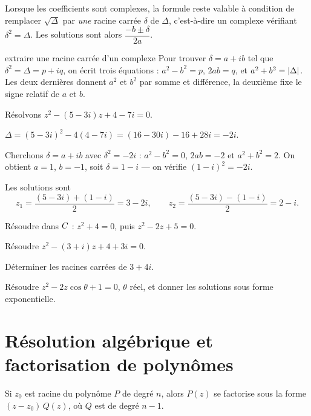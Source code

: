 \begin{propriete}
Lorsque les coefficients sont complexes, la formule reste valable à condition
de remplacer $\sqrt\Delta$ par \emph{une} racine carrée $\delta$ de $\Delta$,
c'est-à-dire un complexe vérifiant $\delta^{2} = \Delta$. Les solutions sont
alors $\dfrac{-b\pm\delta}{2a}$.
\end{propriete}

\begin{methode}{extraire une racine carrée d'un complexe}
Pour trouver $\delta = a+ib$ tel que $\delta^{2} = \Delta = p+iq$, on écrit
trois équations : $a^{2}-b^{2} = p$, $2ab = q$, et
$a^{2}+b^{2} = \left|\Delta\right|$. Les deux dernières donnent $a^{2}$ et $b^{2}$ par
somme et différence, la deuxième fixe le signe relatif de $a$ et $b$.
\end{methode}

\begin{exemple}
Résolvons $z^{2}-(5-3i)z+4-7i = 0$.

$\Delta = (5-3i)^{2}-4(4-7i) = (16-30i)-16+28i = -2i$.

Cherchons $\delta = a+ib$ avec $\delta^{2} = -2i$ : $a^{2}-b^{2} = 0$,
$2ab = -2$ et $a^{2}+b^{2} = 2$. On obtient $a = 1$, $b = -1$, soit
$\delta = 1-i$ — on vérifie $(1-i)^{2} = -2i$.

Les solutions sont
\[
  z_{1} = \frac{(5-3i)+(1-i)}{2} = 3-2i,
  \qquad
  z_{2} = \frac{(5-3i)-(1-i)}{2} = 2-i .
\]
\end{exemple}

\begin{entrainement}[équations]
\exo[\niveau{1}] Résoudre dans $C$ : $z^{2}+4 = 0$, puis $z^{2}-2z+5 = 0$.

\exo[\niveau{2}] Résoudre $z^{2}-(3+i)z+4+3i = 0$.

\exo[\niveau{2}] Déterminer les racines carrées de $3+4i$.

\exo[\niveau{3}] Résoudre $z^{2}-2z\cos\theta+1 = 0$, $\theta$ réel, et donner
les solutions sous forme exponentielle.
\end{entrainement}

\section{Résolution algébrique et factorisation de polynômes}

\begin{propriete}
Si $z_{0}$ est racine du polynôme $P$ de degré $n$, alors $P(z)$ se factorise
sous la forme $(z-z_{0})\,Q(z)$, où $Q$ est de degré $n-1$.
\end{propriete}

